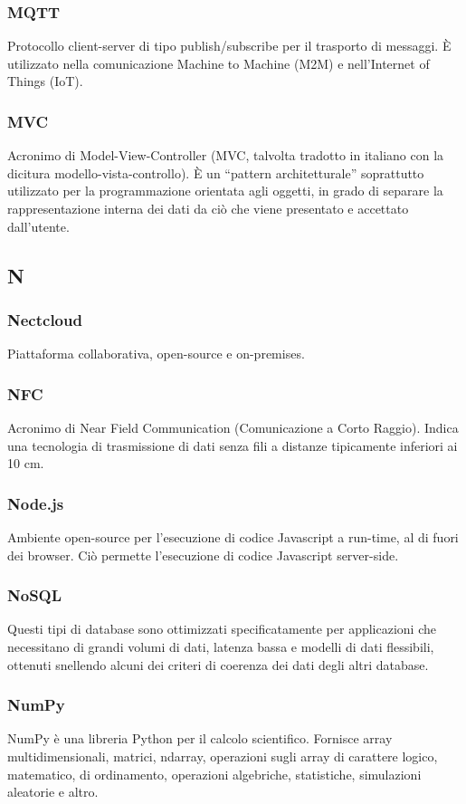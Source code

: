 \subsubsection*{MQTT} Protocollo client-server di tipo publish/subscribe per il trasporto di messaggi. È utilizzato nella comunicazione Machine to Machine (M2M) e nell'Internet of Things (IoT).
\subsubsection*{MVC} Acronimo di Model-View-Controller (MVC, talvolta tradotto in italiano con la dicitura modello-vista-controllo). È un “pattern architetturale”  soprattutto utilizzato per la programmazione orientata agli oggetti, in grado di separare la rappresentazione interna dei dati da ciò che viene presentato e accettato dall'utente.
\subsection*{N}
\subsubsection*{Nectcloud} Piattaforma collaborativa, open-source e on-premises.
\subsubsection*{NFC} Acronimo di Near Field Communication (Comunicazione a Corto Raggio). Indica una tecnologia di trasmissione di dati senza fili a distanze tipicamente inferiori ai 10 cm.
\subsubsection*{Node.js} Ambiente open-source per l'esecuzione di codice Javascript a run-time, al di fuori dei browser. Ciò permette l'esecuzione di codice Javascript server-side.
\subsubsection*{NoSQL} Questi tipi di database sono ottimizzati specificatamente per applicazioni che necessitano di grandi volumi di dati, latenza bassa e modelli di dati flessibili, ottenuti snellendo alcuni dei criteri di coerenza dei dati degli altri database.
\subsubsection*{NumPy} NumPy è una libreria Python per il calcolo scientifico. Fornisce array multidimensionali, matrici, ndarray, operazioni sugli array di carattere logico, matematico, di ordinamento, operazioni algebriche, statistiche, simulazioni aleatorie e altro.
